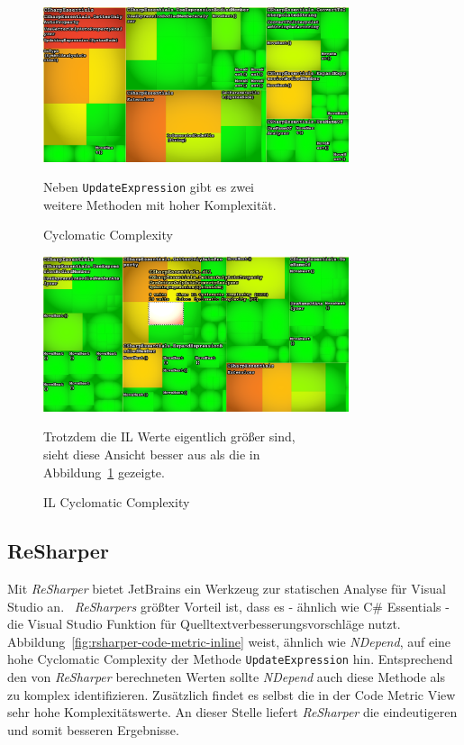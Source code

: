 \begin{figure}[!ht]
	\centering
	\includegraphics[width=0.8\textwidth]{images/nd-cyclomatic-complexity.png}
	\caption{Cyclomatic Complexity}
	\vspace{0.1cm}
	Neben \texttt{UpdateExpression} gibt es zwei\\ weitere Methoden mit hoher Komplexität.
	\label{fig:nd-cyclomatic-complexity}
\end{figure}

\begin{figure}[!ht]
	\centering
	\includegraphics[width=0.8\textwidth]{images/nd-il-cyclomatic-complexity.png}
	\caption{IL Cyclomatic Complexity}
	\vspace{0.1cm}
	Trotzdem die IL Werte eigentlich größer sind, \\
	sieht diese Ansicht besser aus als die in \\ Abbildung~\ref{fig:nd-cyclomatic-complexity} gezeigte.
	\label{fig:nd-il-cyclomatic-complexity}
\end{figure}

\subsection{ReSharper}
Mit \emph{ReSharper} bietet JetBrains ein Werkzeug zur statischen Analyse für Visual Studio an.~\cite{resharper} \emph{ReSharpers} größter Vorteil ist, dass es - ähnlich wie C\# Essentials - die Visual Studio Funktion für Quelltextverbesserungsvorschläge nutzt. Abbildung~\ref{fig:rsharper-code-metric-inline} weist, ähnlich wie \emph{NDepend}, auf eine hohe Cyclomatic Complexity der Methode \texttt{UpdateExpression} hin. Entsprechend den von \emph{ReSharper} berechneten Werten sollte \emph{NDepend} auch diese Methode als zu komplex identifizieren. Zusätzlich findet es selbst die in der Code Metric View sehr hohe Komplexitätswerte. An dieser Stelle liefert \emph{ReSharper} die eindeutigeren und somit besseren Ergebnisse.

